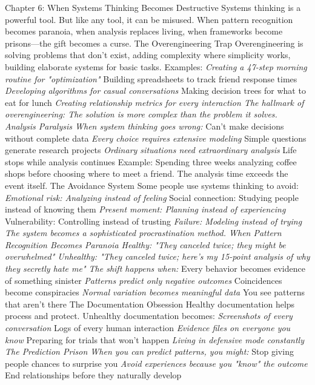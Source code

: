 \documentclass[12pt]{book}
\begin{document}
Chapter 6: When Systems Thinking Becomes Destructive
Systems thinking is a powerful tool. But like any tool, it can be misused. When pattern recognition becomes paranoia, when analysis replaces living, when frameworks become prisons—the gift becomes a curse.
The Overengineering Trap
Overengineering is solving problems that don't exist, adding complexity where simplicity works, building elaborate systems for basic tasks.
Examples:
\textit{ Creating a 47-step morning routine for "optimization"
} Building spreadsheets to track friend response times
\textit{ Developing algorithms for casual conversations
} Making decision trees for what to eat for lunch
\textit{ Creating relationship metrics for every interaction
The hallmark of overengineering: The solution is more complex than the problem it solves.
Analysis Paralysis
When system thinking goes wrong:
} Can't make decisions without complete data
\textit{ Every choice requires extensive modeling
} Simple questions generate research projects
\textit{ Ordinary situations need extraordinary analysis
} Life stops while analysis continues
Example: Spending three weeks analyzing coffee shops before choosing where to meet a friend. The analysis time exceeds the event itself.
The Avoidance System
Some people use systems thinking to avoid:
\textit{ Emotional risk: Analyzing instead of feeling
} Social connection: Studying people instead of knowing them
\textit{ Present moment: Planning instead of experiencing
} Vulnerability: Controlling instead of trusting
\textit{ Failure: Modeling instead of trying
The system becomes a sophisticated procrastination method.
When Pattern Recognition Becomes Paranoia
Healthy: "They canceled twice; they might be overwhelmed" Unhealthy: "They canceled twice; here's my 15-point analysis of why they secretly hate me"
The shift happens when:
} Every behavior becomes evidence of something sinister
\textit{ Patterns predict only negative outcomes
} Coincidences become conspiracies
\textit{ Normal variation becomes meaningful data
} You see patterns that aren't there
The Documentation Obsession
Healthy documentation helps process and protect. Unhealthy documentation becomes:
\textit{ Screenshots of every conversation
} Logs of every human interaction
\textit{ Evidence files on everyone you know
} Preparing for trials that won't happen
\textit{ Living in defensive mode constantly
The Prediction Prison
When you can predict patterns, you might:
} Stop giving people chances to surprise you
\textit{ Avoid experiences because you "know" the outcome
} End relationships before they naturally develop
\end{document}
